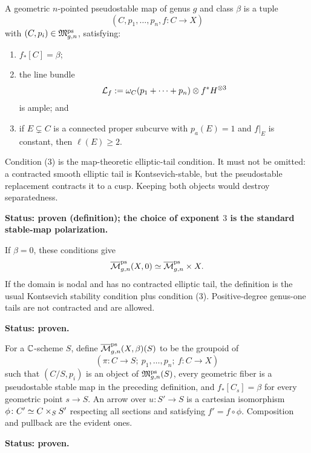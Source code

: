 \documentclass[12pt]{memoir}
\begin{document}
\begin{Def}
    \label{def-pseudostable-stable-map}
    A geometric \(n\)-pointed pseudostable map of genus \(g\) and class
    \(\beta\) is a tuple
    \[
        (C,p_1,\ldots,p_n,f\colon C\to X)
    \]
    with \((C,p_i)\in\mathfrak M^{\operatorname{\mathrm{ps}}}_{g,n}\), satisfying:
    \begin{enumerate}
        \item \(f_*[C]=\beta\);
        \item the line bundle
        \[
            \mathcal{L}_f:=\omega_C(p_1+\cdots+p_n)\otimes f^*H^{\otimes3}
        \]
        is ample; and
        \item if \(E\subsetneq C\) is a connected proper subcurve with
        \(p_a(E)=1\) and \(f|_E\) is constant, then \(\ell(E)\geq2\).
    \end{enumerate}
    Condition (3) is the map-theoretic elliptic-tail condition.  It must not
    be omitted: a contracted smooth elliptic tail is Kontsevich-stable, but
    the pseudostable replacement contracts it to a cusp.  Keeping both
    objects would destroy separatedness.

    \noindent\textbf{Status: proven (definition); the choice of exponent
    \(3\) is the standard stable-map polarization.}
\end{Def}

\begin{Rmk}
    If \(\beta=0\), these conditions give
    \[
        \overline{\mathcal{M}}^{\operatorname{\mathrm{ps}}}_{g,n}(X,0)
        \simeq \overline{\mathcal{M}}^{\operatorname{\mathrm{ps}}}_{g,n}\times X.
    \]
    If the domain is nodal and has no contracted elliptic tail, the
    definition is the usual Kontsevich stability condition plus condition
    (3).  Positive-degree genus-one tails are not contracted and are allowed.

    \noindent\textbf{Status: proven.}
\end{Rmk}

\begin{Def}
    \label{def-ps-map-functor}
    For a \(\mathbb{C}\)-scheme \(S\), define
    \(\overline{\mathcal{M}}^{\operatorname{\mathrm{ps}}}_{g,n}(X,\beta)(S)\) to be the groupoid of
    \[
        (\pi\colon C\to S;\ p_1,\ldots,p_n;\ f\colon C\to X)
    \]
    such that \((C/S,p_i)\) is an object of
    \(\mathfrak M^{\operatorname{\mathrm{ps}}}_{g,n}(S)\), every geometric fiber is a
    pseudostable stable map in the preceding definition, and
    \(f_*[C_s]=\beta\) for every geometric point \(s\to S\).
    An arrow over \(u\colon S'\to S\) is a cartesian isomorphism
    \(\phi\colon C'\simeq C\times_S S'\) respecting all sections and satisfying
    \(f'=f\circ\phi\).  Composition and pullback are the evident ones.

    \noindent\textbf{Status: proven.}
\end{Def}
\end{document}
